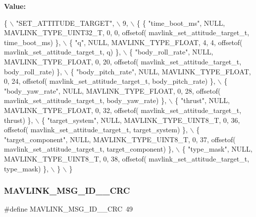 {\bfseries Value\+:}
\begin{DoxyCode}
\{ \(\backslash\)
    \textcolor{stringliteral}{"SET\_ATTITUDE\_TARGET"}, \(\backslash\)
    9, \(\backslash\)
    \{  \{ \textcolor{stringliteral}{"time\_boot\_ms"}, NULL, MAVLINK_TYPE_UINT32_T, 0, 0, offsetof(
      mavlink_set_attitude_target_t, time\_boot\_ms) \}, \(\backslash\)
         \{ \textcolor{stringliteral}{"q"}, NULL, MAVLINK_TYPE_FLOAT, 4, 4, offsetof(
      mavlink_set_attitude_target_t, q) \}, \(\backslash\)
         \{ \textcolor{stringliteral}{"body\_roll\_rate"}, NULL, MAVLINK_TYPE_FLOAT, 0, 20, offsetof(
      mavlink_set_attitude_target_t, body\_roll\_rate) \}, \(\backslash\)
         \{ \textcolor{stringliteral}{"body\_pitch\_rate"}, NULL, MAVLINK_TYPE_FLOAT, 0, 24, offsetof(
      mavlink_set_attitude_target_t, body\_pitch\_rate) \}, \(\backslash\)
         \{ \textcolor{stringliteral}{"body\_yaw\_rate"}, NULL, MAVLINK_TYPE_FLOAT, 0, 28, offsetof(
      mavlink_set_attitude_target_t, body\_yaw\_rate) \}, \(\backslash\)
         \{ \textcolor{stringliteral}{"thrust"}, NULL, MAVLINK_TYPE_FLOAT, 0, 32, offsetof(
      mavlink_set_attitude_target_t, thrust) \}, \(\backslash\)
         \{ \textcolor{stringliteral}{"target\_system"}, NULL, MAVLINK_TYPE_UINT8_T, 0, 36, offsetof(
      mavlink_set_attitude_target_t, target\_system) \}, \(\backslash\)
         \{ \textcolor{stringliteral}{"target\_component"}, NULL, MAVLINK_TYPE_UINT8_T, 0, 37, offsetof(
      mavlink_set_attitude_target_t, target\_component) \}, \(\backslash\)
         \{ \textcolor{stringliteral}{"type\_mask"}, NULL, MAVLINK_TYPE_UINT8_T, 0, 38, offsetof(
      mavlink_set_attitude_target_t, type\_mask) \}, \(\backslash\)
         \} \(\backslash\)
\}
\end{DoxyCode}
\mbox{\label{mavlink__msg__set__attitude__target_8h_a27df9943bdaf6ec85707e6bd86e5a330}} 
\subsubsection{M\+A\+V\+L\+I\+N\+K\+\_\+\+M\+S\+G\+\_\+\+I\+D\+\_\+\_\+\+C\+RC}
{\footnotesize\ttfamily \#define M\+A\+V\+L\+I\+N\+K\+\_\+\+M\+S\+G\+\_\+\+I\+D\+\_\+\_\+\+C\+RC~49}

